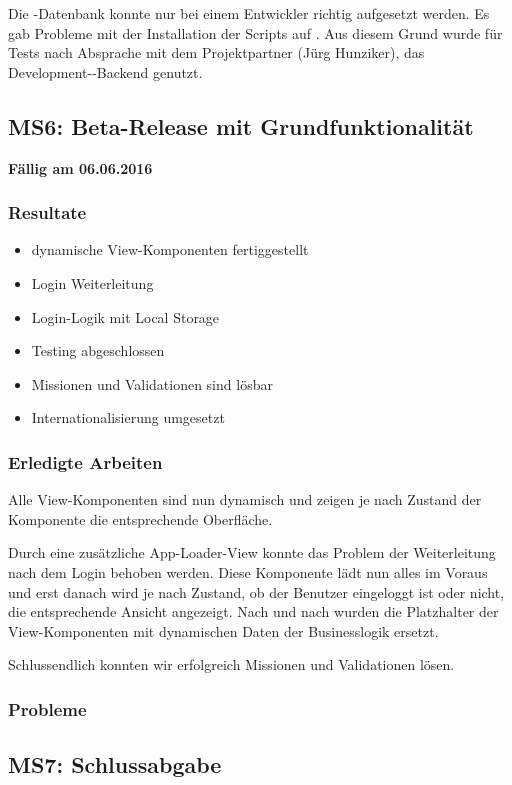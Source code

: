 Die \kort{}-Datenbank konnte nur bei einem Entwickler richtig aufgesetzt werden. 
Es gab Probleme mit der Installation der Scripts auf .
Aus diesem Grund wurde für Tests nach Absprache mit dem Projektpartner (Jürg Hunziker), das Development-\kort{}-Backend genutzt.

\subsection{MS6: Beta-Release mit Grundfunktionalität}
\label{pm-ms6}
\textbf{Fällig am 06.06.2016}
\subsubsection{Resultate}
\begin{itemize}
	\item dynamische View-Komponenten fertiggestellt
	\item Login Weiterleitung
	\item Login-Logik mit Local Storage
	\item Testing abgeschlossen
	\item Missionen und Validationen sind lösbar
	\item Internationalisierung umgesetzt
\end{itemize}

\subsubsection{Erledigte Arbeiten}
Alle View-Komponenten sind nun dynamisch und zeigen je nach Zustand der Komponente die entsprechende Oberfläche.

Durch eine zusätzliche App-Loader-View konnte das Problem der Weiterleitung nach dem Login behoben werden.
Diese Komponente lädt nun alles im Voraus und erst danach wird je nach Zustand, ob der Benutzer eingeloggt ist oder nicht, die entsprechende Ansicht angezeigt.
Nach und nach wurden die Platzhalter der View-Komponenten mit dynamischen Daten der Businesslogik ersetzt.

Schlussendlich konnten wir erfolgreich Missionen und Validationen lösen.


\subsubsection{Probleme}


\subsection{MS7: Schlussabgabe}
\label{pm-ms7}

